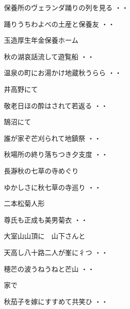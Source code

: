 \begin{shiika}保養所のヴェランダ踊りの列を見る
\hfill{・・}\end{shiika}
\begin{shiika}踊りうちわよべの土産と保養友
\hfill{・・}\end{shiika}
\vspace{0.6cm}
玉造厚生年金保養ホーム
\begin{shiika}秋の湖哀話流して遊覧船
\hfill{・・}\end{shiika}
\begin{shiika}温泉の町にお湯かけ地蔵秋うらら
\hfill{・・}\end{shiika}
\vspace{0.6cm}
井高野にて
\begin{shiika}敬老日ほの酔はされて若返る
\hfill{・・}\end{shiika}
\vspace{0.6cm}
鵠沼にて
\begin{shiika}誰が家ぞ芒刈られて地鎮祭
\hfill{・・}\end{shiika}
\begin{shiika}秋場所の終り落ちつき夕支度
\hfill{・・}\end{shiika}
\vspace{0.6cm}
長瀞秋の七草の寺めぐり
\begin{shiika}ゆかしさに秋七草の寺巡り
\hfill{・・}\end{shiika}
\vspace{0.6cm}
二本松菊人形		
\begin{shiika}尊氏も正成も美男菊衣
\hfill{・・}\end{shiika}
\vspace{0.6cm}
大室山山頂に　山下さんと
\begin{shiika}天高し八十路二人が峯に彳つ
\hfill{・・}\end{shiika}
\begin{shiika}穂芒の波うねうねと芒山
\hfill{・・}\end{shiika}
\vspace{0.6cm}
家で
\begin{shiika}秋茄子を嫁にすすめて共笑ひ
\hfill{・・}\end{shiika}
